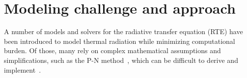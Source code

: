 









\section{Modeling challenge and approach}
A number of models and solvers for the radiative transfer equation (RTE) have been introduced to model thermal radiation while minimizing computational burden.
Of those, many rely on complex mathematical assumptions and simplifications, such as the P-N method~\cite{Modest2008EllipticGeometries}, which can be difficult to derive and implement~\cite{Ge2015ImplementationOpenfoam}. 


